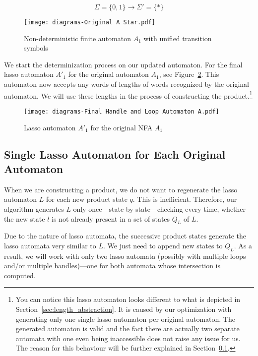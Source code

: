 $$\Sigma = \{0, 1\} \longrightarrow \Sigma' = \{*\} $$

\begin{figure}[ht]
	\centering
	\texttt{[image: diagrams-Original A Star.pdf]}
	\caption{Non-deterministic finite automaton $A_1$ with unified transition symbols}
	\label{fig:NFA_A1_star}
\end{figure}

We start the determinization process on our updated automaton. For the final lasso automaton $A'_1$ for the original automaton $A_1$, see Figure~\ref{fig:HaL_A1}. This automaton now accepts any words of lengths of words recognized by the original automaton. We will use these lengths in the process of constructing the product.\footnote{You can notice this lasso automaton looks different to what is depicted in Section~\ref{sec:length_abstraction}. It is caused by our optimization with generating only one single lasso automaton per original automaton. The generated automaton is valid and the fact there are actually two separate automata with one even being inaccessible does not raise any issue for us. The reason for this behaviour will be further explained in Section~\ref{sec:singleHaL}.}

 \begin{figure}[ht]
	\centering
	\texttt{[image: diagrams-Final Handle and Loop Automaton A.pdf]}
	\caption{Lasso automaton $A'_1$ for the original NFA $A_1$}
	\label{fig:HaL_A1}
\end{figure}



\subsection{Single Lasso Automaton for Each Original Automaton}\label{sec:singleHaL}

When we are constructing a product, we do not want to regenerate the lasso  automaton $L$ for each new product state $q$. This is inefficient. Therefore, our algorithm generates $L$ only once---state by state---checking every time, whether the new state $l$ is not already present in a set of states $Q_L$ of $L$.

Due to the nature of lasso automata, the successive product states generate the lasso automata very similar to $L$. We just need to append new states to $Q_L$. As a result, we will work with only two lasso automata (possibly with multiple loops and/or multiple handles)---one for both automata whose intersection is computed.

